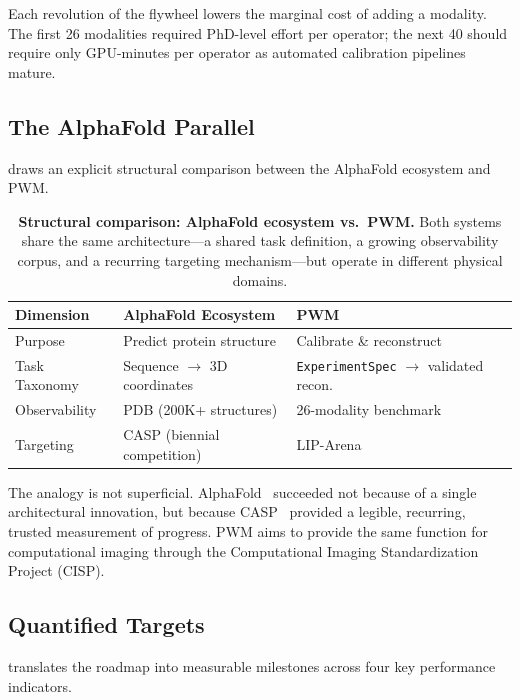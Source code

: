 \noindent
Each revolution of the flywheel lowers the marginal cost of adding a
modality.  The first 26 modalities required PhD-level effort per
operator; the next 40 should require only GPU-minutes per operator as
automated calibration pipelines mature.

\subsection{The AlphaFold Parallel}

 draws an explicit structural comparison between the
AlphaFold ecosystem and PWM.

\begin{table}[t]
\centering
\caption{%
  \textbf{Structural comparison: AlphaFold ecosystem vs.\ PWM.}
  Both systems share the same architecture---a shared task definition,
  a growing observability corpus, and a recurring targeting mechanism---but
  operate in different physical domains.}
\label{tab:alphafold}
\small
\begin{tabular}{@{}lll@{}}
\toprule
\textbf{Dimension} & \textbf{AlphaFold Ecosystem} & \textbf{PWM} \\
\midrule
Purpose
  & Predict protein structure
  & Calibrate \& reconstruct \\
Task Taxonomy
  & Sequence $\to$ 3D coordinates
  & \texttt{ExperimentSpec} $\to$ validated recon.\ \\
Observability
  & PDB (200K+ structures)
  & 26-modality benchmark \\
Targeting
  & CASP (biennial competition)
  & LIP-Arena \\
\bottomrule
\end{tabular}
\end{table}

\noindent
The analogy is not superficial.  AlphaFold~\cite{jumper2021alphafold} succeeded not because of a
single architectural innovation, but because CASP~\cite{moult2005casp} provided a legible,
recurring, trusted measurement of progress.  PWM aims to provide the
same function for computational imaging through the Computational Imaging
Standardization Project (CISP).

\subsection{Quantified Targets}

 translates the roadmap into measurable milestones
across four key performance indicators.

